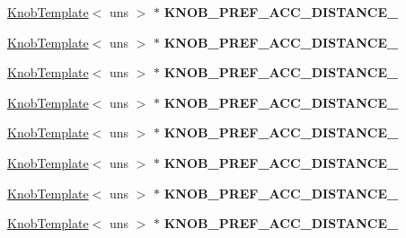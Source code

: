 \begin{DoxyCompactItemize}
\item 
\hypertarget{classall__knobs__c_a45cf72b437e7fafff47d9a1ee4c76f87}{
\hyperlink{classKnobTemplate}{KnobTemplate}$<$ uns $>$ $\ast$ {\bfseries KNOB\_\-PREF\_\-ACC\_\-DISTANCE\_}}
\label{classall__knobs__c_a45cf72b437e7fafff47d9a1ee4c76f87}

\item 
\hypertarget{classall__knobs__c_a98254ecec6b4cdb4b1a8acdeadd3165a}{
\hyperlink{classKnobTemplate}{KnobTemplate}$<$ uns $>$ $\ast$ {\bfseries KNOB\_\-PREF\_\-ACC\_\-DISTANCE\_}}
\label{classall__knobs__c_a98254ecec6b4cdb4b1a8acdeadd3165a}

\item 
\hypertarget{classall__knobs__c_ad658e64fd5f26039b2d3754d729071ee}{
\hyperlink{classKnobTemplate}{KnobTemplate}$<$ uns $>$ $\ast$ {\bfseries KNOB\_\-PREF\_\-ACC\_\-DISTANCE\_}}
\label{classall__knobs__c_ad658e64fd5f26039b2d3754d729071ee}

\item 
\hypertarget{classall__knobs__c_a687a0f7fca35469e18cc7aa37944ec06}{
\hyperlink{classKnobTemplate}{KnobTemplate}$<$ uns $>$ $\ast$ {\bfseries KNOB\_\-PREF\_\-ACC\_\-DISTANCE\_}}
\label{classall__knobs__c_a687a0f7fca35469e18cc7aa37944ec06}

\item 
\hypertarget{classall__knobs__c_a031f1e9adc6e55cdf148fdd2f6e0c7fc}{
\hyperlink{classKnobTemplate}{KnobTemplate}$<$ uns $>$ $\ast$ {\bfseries KNOB\_\-PREF\_\-ACC\_\-DISTANCE\_}}
\label{classall__knobs__c_a031f1e9adc6e55cdf148fdd2f6e0c7fc}

\item 
\hypertarget{classall__knobs__c_ab76bd952e74f48e0801f0da69f71b4a4}{
\hyperlink{classKnobTemplate}{KnobTemplate}$<$ uns $>$ $\ast$ {\bfseries KNOB\_\-PREF\_\-ACC\_\-DISTANCE\_}}
\label{classall__knobs__c_ab76bd952e74f48e0801f0da69f71b4a4}

\item 
\hypertarget{classall__knobs__c_aaa30b98c55729f533fa24caedfd084d1}{
\hyperlink{classKnobTemplate}{KnobTemplate}$<$ uns $>$ $\ast$ {\bfseries KNOB\_\-PREF\_\-ACC\_\-DISTANCE\_}}
\label{classall__knobs__c_aaa30b98c55729f533fa24caedfd084d1}

\item 
\hypertarget{classall__knobs__c_a8ffa0b16505732f68f763135c6570469}{
\hyperlink{classKnobTemplate}{KnobTemplate}$<$ uns $>$ $\ast$ {\bfseries KNOB\_\-PREF\_\-ACC\_\-DISTANCE\_}}
\label{classall__knobs__c_a8ffa0b16505732f68f763135c6570469}


\end{DoxyCompactItemize}
